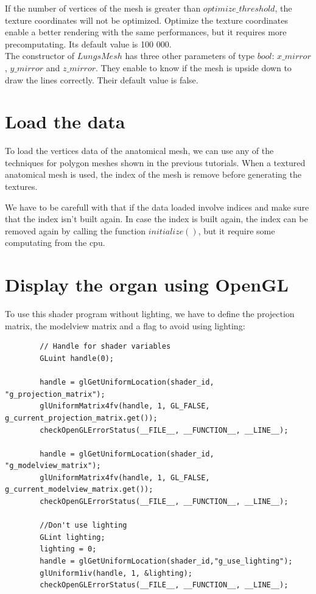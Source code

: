 \documentclass[12pt]{report}
\begin{document}
	If the number of vertices of the mesh is greater than $optimize\_threshold$, the texture coordinates will not be optimized. Optimize the texture coordinates enable a better rendering with the same performances, but it requires more precomputating. Its default value is 100 000. \\
	
	The constructor of $LungsMesh$ has three other parameters of type $bool$: $x\_mirror$, $y\_mirror$ and $z\_mirror$. They enable to know if the mesh is upside down to draw the lines correctly. Their default value is false.

\chapter{Load the data}

To load the vertices data of the anatomical mesh, we can use any of the techniques for polygon meshes shown in the previous tutorials. When a textured anatomical mesh is used, the index of the mesh is remove before generating the textures.

	We have to be carefull with that if the data loaded involve indices and make sure that the index isn't built again. In case the index is built again, the index can be removed again by calling the function $initialize()$, but it require some computating from the cpu.

\chapter{Display the organ using OpenGL}

To use this shader program without lighting, we have to define the projection matrix, the modelview matrix and a flag to avoid using lighting:

\begin{lstlisting}
        // Handle for shader variables
    	GLuint handle(0);

    	handle = glGetUniformLocation(shader_id, "g_projection_matrix");
        glUniformMatrix4fv(handle, 1, GL_FALSE, g_current_projection_matrix.get());
        checkOpenGLErrorStatus(__FILE__, __FUNCTION__, __LINE__);

        handle = glGetUniformLocation(shader_id, "g_modelview_matrix");
        glUniformMatrix4fv(handle, 1, GL_FALSE, g_current_modelview_matrix.get());
        checkOpenGLErrorStatus(__FILE__, __FUNCTION__, __LINE__);

        //Don't use lighting
        GLint lighting;
        lighting = 0;
        handle = glGetUniformLocation(shader_id,"g_use_lighting");
        glUniform1iv(handle, 1, &lighting);
        checkOpenGLErrorStatus(__FILE__, __FUNCTION__, __LINE__);
\end{lstlisting}
\end{document}
